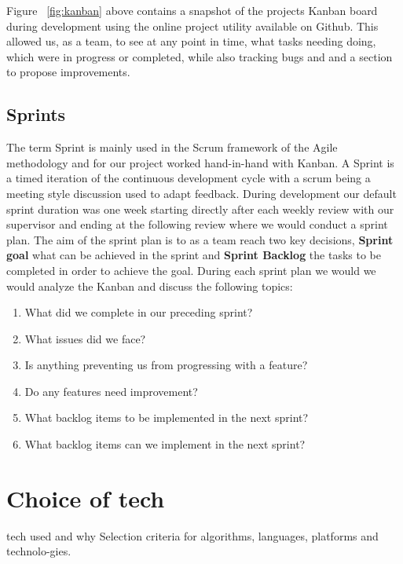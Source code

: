 Figure  ~\ref{fig:kanban} above contains a snapshot of the projects Kanban board during development using the online project utility available on Github. This allowed us, as a team, to see at any point in time, what tasks needing doing, which were in progress or completed, while also tracking bugs and and a section to propose improvements.

\subsection{Sprints}
The term Sprint is mainly used in the Scrum framework of the Agile methodology and for our project worked hand-in-hand with Kanban. A Sprint is a timed iteration of the continuous development cycle with a scrum being a meeting style discussion used to adapt feedback. During development our default sprint duration was one week starting directly after each weekly review with our supervisor and ending at the following review where we would conduct a sprint plan. The aim of the sprint plan is to as a team reach two key decisions, \textbf{Sprint goal} what can be achieved in the sprint and \textbf{Sprint Backlog} the tasks to be completed in order to achieve the goal. During each sprint plan we would we would analyze the Kanban and discuss the following topics:

\begin{enumerate}
  \item What did we complete in our preceding sprint?
  \item What issues did we face?
  \item Is anything preventing us from progressing with a feature?
  \item Do any features need improvement?
  \item What backlog items to be implemented in the next sprint?
  \item What backlog items can we implement in the next sprint?
\end{enumerate}







\section{Choice of tech }
tech used and why
 Selection criteria for algorithms, languages, platforms and technolo-gies.
 
